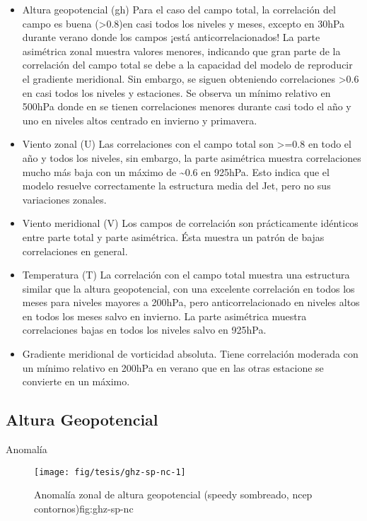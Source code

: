 \documentclass[spanish,a4paper]{book}
\begin{document}
\begin{itemize}
\item
  Altura geopotencial (gh) Para el caso del campo total, la correlación
  del campo es buena (\textgreater{}0.8)en casi todos los niveles y
  meses, excepto en 30hPa durante verano donde los campos ¡está
  anticorrelacionados! La parte asimétrica zonal muestra valores
  menores, indicando que gran parte de la correlación del campo total se
  debe a la capacidad del modelo de reproducir el gradiente meridional.
  Sin embargo, se siguen obteniendo correlaciones \textgreater{}0.6 en
  casi todos los niveles y estaciones. Se observa un mínimo relativo en
  500hPa donde en se tienen correlaciones menores durante casi todo el
  año y uno en niveles altos centrado en invierno y primavera.
\item
  Viento zonal (U) Las correlaciones con el campo total son
  \textgreater{}=0.8 en todo el año y todos los niveles, sin embargo, la
  parte asimétrica muestra correlaciones mucho más baja con un máximo de
  \textasciitilde{}0.6 en 925hPa. Esto indica que el modelo resuelve
  correctamente la estructura media del Jet, pero no sus variaciones
  zonales.
\item
  Viento meridional (V) Los campos de correlación son prácticamente
  idénticos entre parte total y parte asimétrica. Ésta muestra un patrón
  de bajas correlaciones en general.
\item
  Temperatura (T) La correlación con el campo total muestra una
  estructura similar que la altura geopotencial, con una excelente
  correlación en todos los meses para niveles mayores a 200hPa, pero
  anticorrelacionado en niveles altos en todos los meses salvo en
  invierno. La parte asimétrica muestra correlaciones bajas en todos los
  niveles salvo en 925hPa.
\item
  Gradiente meridional de vorticidad absoluta. Tiene correlación
  moderada con un mínimo relativo en 200hPa en verano que en las otras
  estacione se convierte en un máximo.
\end{itemize}

\subsection{Altura Geopotencial}\label{altura-geopotencial-1}

Anomalía

\begin{figure}

{\centering \texttt{[image: fig/tesis/ghz-sp-nc-1]} 

}

\caption{Anomalía zonal de altura geopotencial (speedy sombreado, ncep contornos){fig:ghz-sp-nc}}\label{fig:ghz-sp-nc}
\end{figure}
\end{document}
